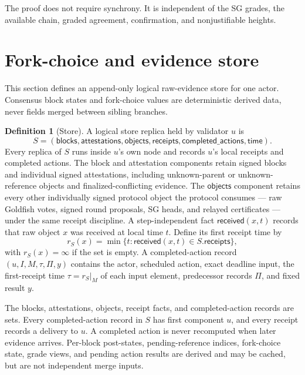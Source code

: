 \ifx\litemode\undefined\documentclass{article}\fi
\theoremstyle{plain}
\theoremstyle{definition}
\newtheorem{definition}{Definition}
\theoremstyle{remark}
\begin{document}
The proof does not require synchrony.  It is independent of the SG grades,
the available chain, graded agreement, confirmation, and nonjustifiable
heights.

\section{Fork-choice and evidence store}\label{sec:store}

This section defines an append-only logical raw-evidence store for one actor.
Consensus block states and fork-choice values are deterministic derived data,
never fields merged between sibling branches.

\begin{definition}[Store]\label{def:stored-data}
A logical store replica held by validator \(u\) is
\[
 S=(\mathsf{blocks},\mathsf{attestations},\mathsf{objects},
    \mathsf{receipts},\mathsf{completed\_actions},\mathsf{time}).
\]
Every replica of \(S\) runs inside \(u\)'s own node and records \(u\)'s local
receipts and completed actions.
The block and attestation components retain signed blocks and individual
signed attestations, including unknown-parent or unknown-reference objects
and finalized-conflicting evidence.  The \(\mathsf{objects}\)
component retains every other individually signed protocol object the
protocol consumes --- raw Goldfish votes, signed round proposals, SG
heads, and relayed certificates --- under the same receipt discipline.  A step-independent fact
\(\mathsf{received}(x,t)\) records that raw object \(x\) was received at
local time \(t\).  Define its first receipt time by
\[
 r_S(x)=\min\{t:\mathsf{received}(x,t)\in S.\mathsf{receipts}\},
\]
with \(r_S(x)=\infty\) if the set is empty.  A completed-action record
\((u,I,M,\tau,\Pi,y)\) contains the actor, scheduled action, exact
deadline input, the first-receipt time \(\tau=r_S|_M\) of each input
element, predecessor records \(\Pi\), and fixed result \(y\).

The blocks, attestations, objects, receipt facts, and completed-action
records are sets.  Every completed-action record in \(S\) has first component \(u\), and
every receipt records a delivery to \(u\).  A completed action is never
recomputed when later evidence arrives.
Per-block post-states, pending-reference indices, fork-choice state, grade
views, and pending action results are derived and may be cached, but are
not independent merge inputs.


\end{definition}
\end{document}
